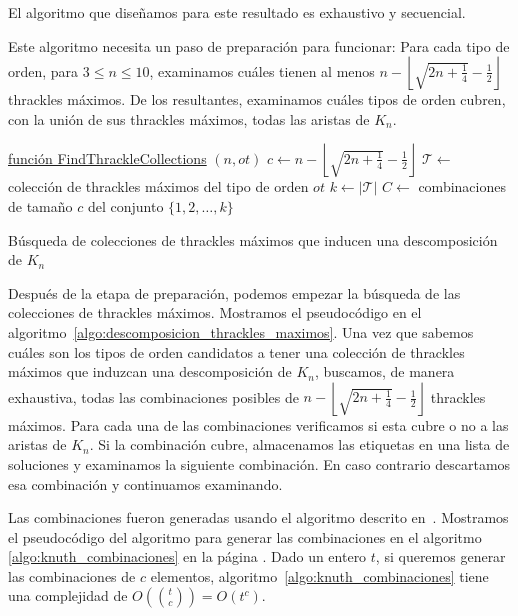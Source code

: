   El algoritmo que diseñamos para este resultado es exhaustivo y secuencial.

  Este algoritmo necesita un paso de preparación para funcionar: Para cada tipo de orden,
  para $3\leq n \leq 10$, examinamos cuáles tienen al menos $n - \left\lfloor\sqrt{2n +
  \frac{1}{4}} - \frac{1}{2}\right\rfloor$ thrackles máximos. De los resultantes,
  examinamos cuáles tipos de orden cubren, con la unión de sus thrackles máximos, todas
  las aristas de $K_n$.

  \begin{algorithm}[H]
    \DontPrintSemicolon
    \underline{función FindThrackleCollections} $(n,ot)$\;
    $c \gets n - \left\lfloor\sqrt{2n + \frac{1}{4}} - \frac{1}{2}\right\rfloor$\;
    $\mathcal{T} \gets $ colección de thrackles máximos del tipo de orden $ot$\;
    $k \gets |\mathcal{T}|$\;
    $C \gets $ combinaciones de tamaño $c$ del conjunto $\{1,2,\dots,k\}$\;
    \caption{Búsqueda de colecciones de thrackles máximos que inducen una descomposición
    de $K_n$}
    \label{algo:descomposicion_thrackles_maximos}
  \end{algorithm}

  Después de la etapa de preparación, podemos empezar la búsqueda de las colecciones de
  thrackles máximos. Mostramos el pseudocódigo en el
  algoritmo~\ref{algo:descomposicion_thrackles_maximos}. Una vez que sabemos cuáles son
  los tipos de orden candidatos a tener una colección de thrackles máximos que induzcan
  una descomposición de $K_n$, buscamos, de manera exhaustiva, todas las combinaciones
  posibles de $n -  \left\lfloor\sqrt{2n + \frac{1}{4}} - \frac{1}{2}\right\rfloor$
  thrackles máximos. Para cada una de las combinaciones verificamos si esta cubre o no a
  las aristas de $K_n$. Si la combinación cubre, almacenamos las etiquetas en una lista
  de soluciones y examinamos la siguiente combinación. En caso contrario descartamos esa
  combinación y continuamos examinando.

  Las combinaciones fueron generadas usando el algoritmo descrito en~\cite{Knuth2011A}.
  Mostramos el pseudocódigo del algoritmo para generar las combinaciones en el algoritmo
  \ref{algo:knuth_combinaciones} en la página \pageref{algo:knuth_combinaciones}. Dado un
  entero $t$, si queremos generar las combinaciones de $c$ elementos,
  algoritmo~\ref{algo:knuth_combinaciones} tiene una complejidad de
  $O\left(\binom{t}{c}\right) = O(t^c)$.

